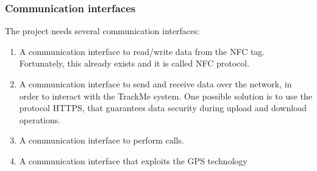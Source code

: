 \subsubsection{Communication interfaces} 
The project needs several communication interfaces:
\begin{enumerate}
\item A communication interface to read/write data from the NFC tag. Fortunately, this already exists and it is called NFC protocol.
\item A communication interface to send and receive data over the network, in order to interact with the TrackMe system. One possible solution is to use the protocol HTTPS, that guarantees data security during upload and download operations. 
\item A communication interface to perform calls. 
\item A communication interface that exploits the GPS technology
\end{enumerate} 
